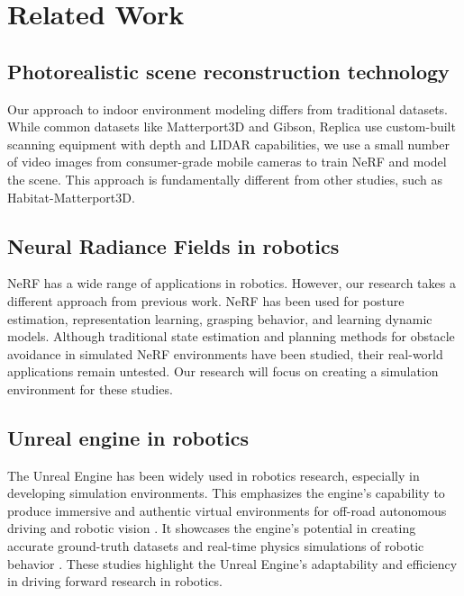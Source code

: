 \chapter{Related Work}
\label{cha:Related Work}
\section{Photorealistic scene reconstruction technology}
\label{sec:Photorealistic scene reconstruction technology}

Our approach to indoor environment modeling differs from traditional datasets. While common datasets like Matterport3D\cite{chang2017matterport3d} and Gibson\cite{xia2018gibson}, Replica\cite{straub2019replica} use custom-built scanning equipment with depth and LIDAR capabilities, we use a small number of video images from consumer-grade mobile cameras to train NeRF and model the scene. This approach is fundamentally different from other studies, such as Habitat-Matterport3D\cite{shah2018airsim}.


\section{Neural Radiance Fields in robotics}
\label{sec:Neural Radiance Fields in robotics}

NeRF has a wide range of applications in robotics. However, our research takes a different approach from previous work. NeRF has been used for posture estimation\cite{lin2021inerf}, representation learning\cite{lin2022nerf-supervision}, grasping behavior\cite{ichnowski2021dex-nerf}, and learning dynamic models\cite{driess2022learning}. Although traditional state estimation and planning methods for obstacle avoidance in simulated NeRF environments have been studied, their real-world applications remain untested. Our research will focus on creating a simulation environment for these studies.

\section{Unreal engine in robotics}
\label{sec:Unreal engine in robotics}
The Unreal Engine has been widely used in robotics research, especially in developing simulation environments. This emphasizes the engine's capability to produce immersive and authentic virtual environments for off-road autonomous driving and robotic vision \cite{young2020unreal, martinez-gonzalez2019unrealrox}. It showcases the engine's potential in creating accurate ground-truth datasets and real-time physics simulations of robotic behavior \cite{pollok2019unrealgt}. These studies highlight the Unreal Engine's adaptability and efficiency in driving forward research in robotics.